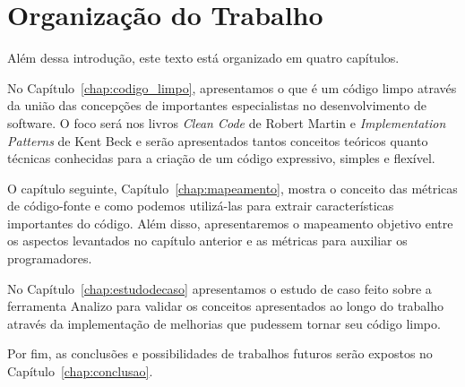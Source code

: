 \section{Organização do Trabalho}
\label{sec:organizacao_trabalho}

Além dessa introdução, este texto está organizado em quatro capítulos.

No Capítulo~\ref{chap:codigo_limpo}, apresentamos o que é um código limpo através
da união das concepções de importantes especialistas no desenvolvimento de software.
O foco será nos livros \textit{Clean Code} de Robert Martin \citep{Martin2008} e \textit{Implementation
Patterns} de Kent Beck \citep{Beck2007} e serão apresentados tantos conceitos teóricos
quanto técnicas conhecidas para a criação de um código expressivo, simples e flexível.

O capítulo seguinte, Capítulo~\ref{chap:mapeamento}, mostra o conceito das métricas de 
código-fonte e como podemos utilizá-las para extrair características importantes do
código. Além disso, apresentaremos o mapeamento objetivo entre os aspectos levantados
no capítulo anterior e as métricas para auxiliar os programadores.

No Capítulo~\ref{chap:estudodecaso} apresentamos o estudo de caso feito sobre a ferramenta Analizo para 
validar os conceitos apresentados ao longo do trabalho através da implementação de melhorias que pudessem 
tornar seu código limpo.

Por fim, as conclusões e possibilidades de trabalhos futuros serão expostos no Capítulo~\ref{chap:conclusao}.
